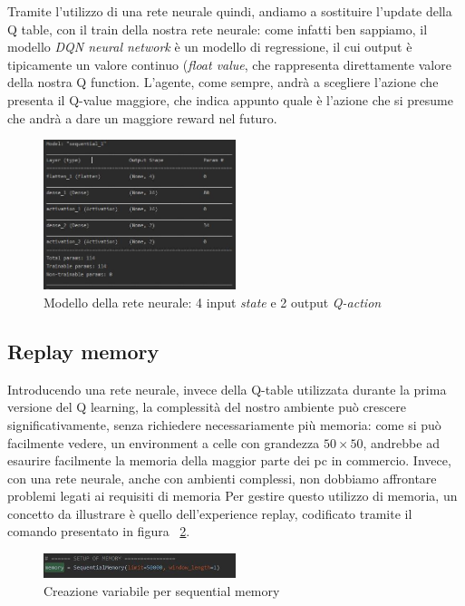 Tramite l'utilizzo di una rete neurale quindi, andiamo a sostituire l'update della Q table, con il train della nostra rete neurale: come infatti ben sappiamo, il modello \textit{DQN neural network} è un modello di regressione, il cui output è tipicamente un valore continuo (\textit{float value}, che rappresenta direttamente valore della nostra Q function. L'agente, come sempre, andrà a scegliere l'azione che presenta il Q-value maggiore, che indica appunto quale è l'azione che si presume che andrà a dare un maggiore reward nel futuro.

\begin{figure}[!h]
	\centering
	\includegraphics[width=0.5\textwidth]{Immagini/Model_of_my_net.JPG}
	\caption{Modello della rete neurale: 4 input \textit{state} e 2 output \textit{Q-action}}
	\label{fig:Model_of_DQN_network}
\end{figure} 


\subsection{Replay memory}
Introducendo una rete neurale, invece della Q-table utilizzata durante la prima versione del Q learning, la complessità del nostro ambiente può crescere significativamente, senza richiedere necessariamente più memoria: come si può facilmente vedere, un environment a celle con grandezza $50 \times 50$, andrebbe ad esaurire facilmente la memoria della maggior parte dei pc in commercio.
Invece, con una rete neurale, anche con ambienti complessi, non dobbiamo affrontare problemi legati ai requisiti di memoria
Per gestire questo utilizzo di memoria, un concetto da illustrare è quello dell’experience replay, codificato tramite il comando presentato in figura ~\ref{fig:SeqMem}.

\begin{figure}[!h]
	\centering
	\includegraphics[width=0.5\textwidth]{Immagini/SequentialMemory.JPG}
	\caption{Creazione variabile per sequential memory}
	\label{fig:SeqMem}
\end{figure}

